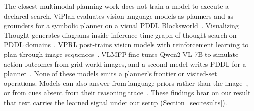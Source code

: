 The closest multimodal planning work does not train a model to execute a declared search. ViPlan evaluates vision-language models as planners and as grounders for a symbolic planner on a visual PDDL Blocksworld~\citep{merler2025viplan}. Visualizing Thought generates diagrams inside inference-time graph-of-thought search on PDDL domains~\citep{borazjanizadeh2025visualizing}. VPRL post-trains vision models with reinforcement learning to plan through image sequences~\citep{xu2025visual}. VLMFP fine-tunes Qwen2-VL-7B to simulate action outcomes from grid-world images, and a second model writes PDDL for a planner~\citep{hao2025simulation}. None of these models emits a planner's frontier or visited-set operations. Models can also answer from language priors rather than the image~\citep{zhu2020overcoming}, or from cues absent from their reasoning trace~\citep{balasubramanian2025closer}. These findings bear on our result that text carries the learned signal under our setup (Section~\ref{sec:results}).

